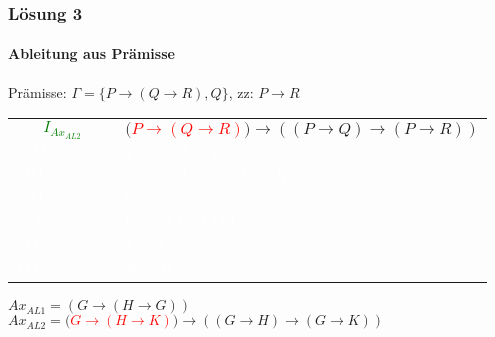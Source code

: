 \begin{frame}
	\frametitle{Lösung 3}
	\framesubtitle{Ableitung aus Prämisse}
	Prämisse: $\Gamma =\{P\rightarrow(Q\rightarrow R), Q\}$, zz: $P\rightarrow R$\\
	\begin{tabular}{cl}
		\textcolor{green}{$I_{Ax_{AL2}}$}           & $($\textcolor{red}{$P\rightarrow(Q\rightarrow R)$}$)\rightarrow((P\rightarrow Q)\rightarrow(P\rightarrow R))$ \\
		\textcolor{white}{$II_{\textit{Prämisse}}$} & \textcolor{white}{$P\rightarrow(Q\rightarrow R)$}                                                             \\
		\textcolor{white}{$III_{MP(I, II)}$}        & \textcolor{white}{$(P\rightarrow Q)\rightarrow(P\rightarrow R)$}                                              \\
		\textcolor{white}{$IV_{\textit{Prämisse}}$} & \textcolor{white}{$Q$}                                                                                        \\
		\textcolor{white}{$V_{IV, Ax_{AL1}}$}       & \textcolor{white}{$Q\rightarrow(P\rightarrow Q)$}                                                             \\
		\textcolor{white}{$VI_{MP(IV, V)}$}         & \textcolor{white}{$P\rightarrow Q$}                                                                           \\
		\textcolor{white}{$VII_{MP(III, VI)}$}      & \textcolor{white}{$P\rightarrow R$}                                                                           \\
	\end{tabular}
	$Ax_{AL1} = (G\rightarrow(H\rightarrow G))$\\
	$Ax_{AL2} = ($\textcolor{red}{$G\rightarrow(H\rightarrow K)$}$)\rightarrow((G\rightarrow H)\rightarrow(G\rightarrow K))$\\
\end{frame}
